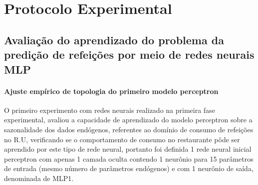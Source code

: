 \section{Protocolo Experimental}
    
    \subsection{Avaliação do aprendizado do problema da predição de refeições por meio de redes neurais MLP}
        \paragraph{Ajuste empírico de topologia do primeiro modelo perceptron}
        O primeiro experimento com redes neurais realizado na primeira fase experimental, avaliou a capacidade de aprendizado do modelo perceptron sobre a sazonalidade dos dados endógenos, referentes ao domínio de consumo de refeições no R.U, verificando se o comportamento de consumo no restaurante pôde ser aprendido por este tipo de rede neural, portanto foi definida 1 rede neural inicial perceptron com apenas 1 camada oculta contendo 1 neurônio para 15 parâmetros de entrada (mesmo número de parâmetros endógenos) e com 1 neurônio de saída, denominada de MLP1.
        
